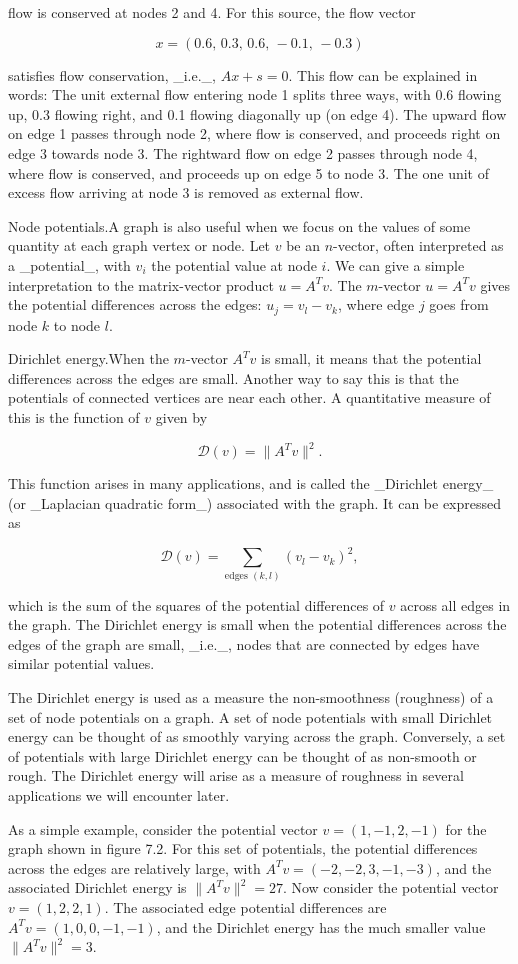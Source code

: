 flow is conserved at nodes 2 and 4. For this source, the flow vector

\[x=(0.6,\,0.3,\,0.6,\,-0.1,\,-0.3)\]

satisfies flow conservation, _i.e._, \(Ax+s=0\). This flow can be explained in words: The unit external flow entering node 1 splits three ways, with 0.6 flowing up, 0.3 flowing right, and 0.1 flowing diagonally up (on edge 4). The upward flow on edge 1 passes through node 2, where flow is conserved, and proceeds right on edge 3 towards node 3. The rightward flow on edge 2 passes through node 4, where flow is conserved, and proceeds up on edge 5 to node 3. The one unit of excess flow arriving at node 3 is removed as external flow.

Node potentials.A graph is also useful when we focus on the values of some quantity at each graph vertex or node. Let \(v\) be an \(n\)-vector, often interpreted as a _potential_, with \(v_{i}\) the potential value at node \(i\). We can give a simple interpretation to the matrix-vector product \(u=A^{T}v\). The \(m\)-vector \(u=A^{T}v\) gives the potential differences across the edges: \(u_{j}=v_{l}-v_{k}\), where edge \(j\) goes from node \(k\) to node \(l\).

Dirichlet energy.When the \(m\)-vector \(A^{T}v\) is small, it means that the potential differences across the edges are small. Another way to say this is that the potentials of connected vertices are near each other. A quantitative measure of this is the function of \(v\) given by

\[\mathcal{D}(v)=\|A^{T}v\|^{2}.\]

This function arises in many applications, and is called the _Dirichlet energy_ (or _Laplacian quadratic form_) associated with the graph. It can be expressed as

\[\mathcal{D}(v)=\sum_{\text{edges }(k,l)}(v_{l}-v_{k})^{2},\]

which is the sum of the squares of the potential differences of \(v\) across all edges in the graph. The Dirichlet energy is small when the potential differences across the edges of the graph are small, _i.e._, nodes that are connected by edges have similar potential values.

The Dirichlet energy is used as a measure the non-smoothness (roughness) of a set of node potentials on a graph. A set of node potentials with small Dirichlet energy can be thought of as smoothly varying across the graph. Conversely, a set of potentials with large Dirichlet energy can be thought of as non-smooth or rough. The Dirichlet energy will arise as a measure of roughness in several applications we will encounter later.

As a simple example, consider the potential vector \(v=(1,-1,2,-1)\) for the graph shown in figure 7.2. For this set of potentials, the potential differences across the edges are relatively large, with \(A^{T}v=(-2,-2,3,-1,-3)\), and the associated Dirichlet energy is \(\|A^{T}v\|^{2}=27\). Now consider the potential vector \(v=(1,2,2,1)\). The associated edge potential differences are \(A^{T}v=(1,0,0,-1,-1)\), and the Dirichlet energy has the much smaller value \(\|A^{T}v\|^{2}=3\).

 